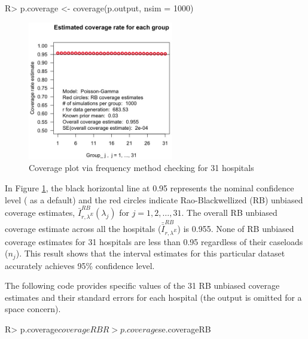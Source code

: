 \documentclass[article]{jss}
\begin{document}
\begin{CodeChunk}
\begin{CodeInput}
R> p.coverage <- coverage(p.output, nsim = 1000)
\end{CodeInput}
\end{CodeChunk}
\begin{figure}[h] 
\begin{center}
\includegraphics[width = 2.5in]{hospital2.png}
\caption{Coverage plot via frequency method checking for 31 hospitals}
\label{fig:hospitalcoverage}
\end{center}
\end{figure}

In Figure \ref{fig:hospitalcoverage}, the black horizontal line at 0.95 represents the nominal confidence level ( as a default) and the red circles indicate Rao-Blackwellized (RB) unbiased coverage estimates, $\bar{I}^{RB}_{r, \lambda^E}(\lambda_j)$ for $j=1, 2, \ldots, 31$. The overall RB unbiased coverage estimate across all the hospitals ($\bar{\bar{I}}^{RB}_{r, \lambda^E}$) is 0.955. None of RB unbiased coverage estimates for 31 hospitals are less than 0.95 regardless of their caseloads ($n_{j}$). This result shows that the interval estimates for this particular dataset accurately achieves 95\% confidence level. 


The following code provides specific values of the 31 RB unbiased coverage estimates and their standard errors for each hospital (the output is omitted for a space concern).
\begin{CodeChunk}
\begin{CodeInput}
R> p.coverage$coverageRB
R> p.coverage$se.coverageRB
\end{CodeInput}
\end{CodeChunk}
\end{document}
